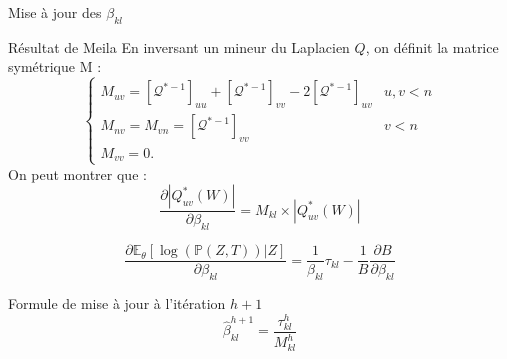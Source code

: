 \documentclass[11pt]{bredelebeamer}
\begin{document}
 \begin{frame}{Mise à jour des $\beta_{kl}$}
 \begin{exampleblock}{Résultat de Meila \cite{MixtTrees}}
En inversant un mineur du Laplacien $Q$, on définit la matrice symétrique M : 
\[\begin{cases}
    M_{uv} = [\mathcal{Q}^{*-1}]_{uu} + [\mathcal{Q}^{*-1}]_{vv} -2[\mathcal{Q}^{*-1}]_{uv} & u,v < n\\
    M_{nv} =M_{vn} =[\mathcal{Q}^{*-1}]_{vv} & v<n\\
     M_{vv} =0.
   \end{cases}\]
On peut montrer que :
\[ \frac{\partial|Q^*_{uv}(W)|}{\partial \beta_{kl}} = M_{kl} \times |Q^*_{uv}(W)|\]
\end{exampleblock}
\[ \frac{\partial\mathds{E}_\theta[\log(\mathds{P}(Z,T))|Z]}{\partial\beta_{kl}} =\frac{1 }{\beta_{kl}} \tau_{kl} - \frac{1}{B}
\frac{\partial B}{\partial\beta_{kl}}
\]


\begin{block}{Formule de mise à jour à l'itération $h+1$}
   \large{\[\hat{\beta}_{kl}^{h+1} = \frac{\tau_{kl}^h}{M_{kl}^h}\]}
   \end{block}
 \end{frame}
\end{document}
